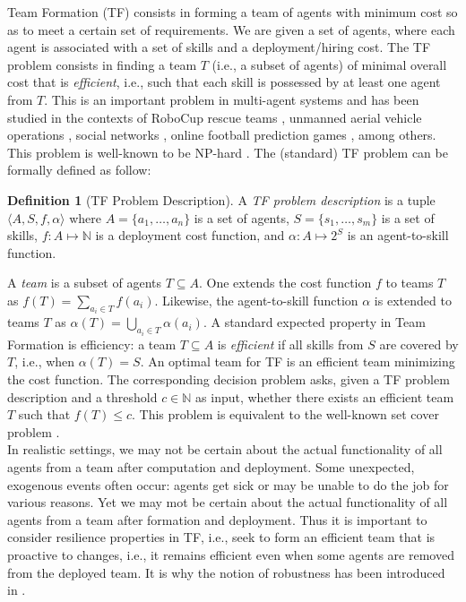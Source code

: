 \documentclass[conference]{IEEEtran}
\theoremstyle{definition}
\newtheorem{definition}{Definition}
\begin{document}
Team Formation (TF) consists in forming a team of agents with minimum cost so as 
to meet a certain set of requirements. 
We are given a set of agents, where each agent is associated with a set of skills and a 
deployment/hiring cost. The TF problem consists in finding a team $T$ 
(i.e., a subset of agents) of minimal overall cost that is \emph{efficient}, i.e.,
such that each skill is possessed by at least one agent from $T$. 
This is an important problem in multi-agent systems and has been studied in the 
contexts of RoboCup rescue teams \cite{DBLP:journals/aim/KitanoT01}, 
unmanned aerial vehicle operations \cite{DBLP:conf/atal/GeorgePSS10}, 
social networks \cite{KargarAZ12,FarhadiHHH12}, 
online football prediction games \cite{MatthewsRC12}, among others. 
This problem is well-known to be NP-hard \cite{DBLP:books/fm/GareyJ79,Okimoto2015}.
The (standard) TF problem \cite{Okimoto2015} can be formally defined as follow:

\begin{definition}[TF Problem Description]
	A \textit{TF problem description} is a tuple $\langle A, S, f, \alpha\rangle$ 
	where $A = \{a_1, \ldots ,a_n\}$ is a set of agents, $S = \{s_1, \ldots, s_m\}$ is a set of 
	skills, $f : A \mapsto \mathbb{N}$ is a deployment cost function, and $\alpha : A \mapsto 2^S$ is an agent-to-skill function.
	\label{def:TFpd}
\end{definition}

A \emph{team} is a subset of agents $T \subseteq A$.
One extends the cost function $f$ to teams $T$ as $f(T) = \sum_{a_i \in T}{f(a_i)}$.
Likewise, the agent-to-skill function $\alpha$ is extended to teams $T$
as $\alpha(T) = \bigcup_{a_i \in T}{\alpha(a_i)}$.
A standard expected property in Team Formation is efficiency:
a team $T \subseteq A$ is \emph{efficient} if all skills from $S$ are covered
by $T$, i.e., when $\alpha(T) = S$.  An optimal team for TF is an
efficient team minimizing the cost function.  The corresponding decision
problem asks, given a TF problem description and a
threshold $c \in \mathbb{N}$ as input, whether there exists an
efficient team $T$ such that $f(T) \leq c$.  This problem is
equivalent to the well-known set cover problem
\cite{DBLP:books/fm/GareyJ79}. \\


In realistic settings, we may not be certain about the actual functionality of 
all agents from a team after computation and deployment.
Some unexpected, exogenous events often occur:
agents get sick or may be unable to do the job for various reasons.
Yet we may mot be certain about the actual functionality of all agents from a team 
after formation and deployment. Thus it is important to consider resilience properties in TF, 
i.e., seek to form an efficient team that is proactive to changes, i.e., it remains efficient 
even when some agents are removed from the deployed team.
It is why the notion of robustness has been introduced in \cite{Okimoto2015}.
\end{document}
